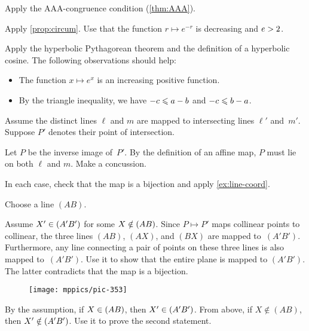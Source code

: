 Apply the AAA-congruence condition (\ref{thm:AAA}).

Apply \ref{prop:circum}.
Use that the function $r\mapsto e^{-r}$ is decreasing and $e>2$.

Apply the hyperbolic Pythagorean theorem and the definition of a hyperbolic cosine.
The following observations should help:
\begin{itemize}
 \item The function $x\mapsto e^x$ is an increasing positive function.
 \item By the triangle inequality,  we have $-c\leqslant a-b$ and $-c\leqslant b-a$.
\end{itemize}

\setcounter{eqtn}{0}

Assume the distinct lines $\ell$ and $m$ 
are mapped to intersecting lines $\ell'$ and~$m'$.
Suppose $P'$ denotes their point of intersection.

Let $P$ be the inverse image of~$P'$.
By the definition of an affine map, $P$ must lie on both $\ell$ and $m$.
Make a concussion.

In each case, check that the map is a bijection and apply \ref{ex:line-coord}.

Choose a line $(AB)$.

Assume $X'\in (A'B')$ for some $X\notin(AB)$.
Since $P\mapsto P'$ maps collinear points to collinear, 
the three lines $(AB)$, $(AX)$, and $(BX)$ are mapped to~$(A'B')$.
Furthermore, any line connecting a pair of points on these three lines is also mapped to~$(A'B')$.
Use it to show that the entire plane is mapped to $(A'B')$.
The latter contradicts that the map is a bijection.

{

\begin{wrapfigure}{r}{22mm}
\vskip-2mm
\centering
\texttt{[image: mppics/pic-353]}
\end{wrapfigure}

By the assumption, if $X\in (AB)$, then $X'\in (A'B')$.
From above, if $X\notin (AB)$, then $X'\notin (A'B')$.
Use it to prove the second statement.

}

